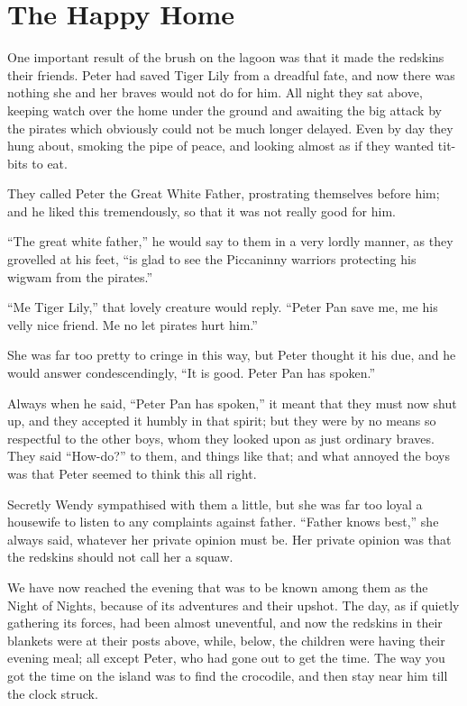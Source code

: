 
\chapter{The Happy Home}

One important result of the brush on the lagoon was that it made the redskins their friends.
Peter had saved Tiger Lily from a dreadful fate,
and now there was nothing she and her braves would not do for him.
All night they sat above,
keeping watch over the home under the ground and awaiting the big attack by the pirates
which obviously could not be much longer delayed.
Even by day they hung about, smoking the pipe of peace, and looking almost as if they wanted tit-bits to eat.

They called Peter the Great White Father, prostrating themselves before him;
and he liked this tremendously, so that it was not really good for him.

“The great white father,” he would say to them in a very lordly manner, as they grovelled at his feet,
“is glad to see the Piccaninny warriors protecting his wigwam from the pirates.”

“Me Tiger Lily,” that lovely creature would reply.
“Peter Pan save me, me his velly nice friend.
Me no let pirates hurt him.”

She was far too pretty to cringe in this way, but Peter thought it his due,
and he would answer condescendingly, “It is good.
Peter Pan has spoken.”

Always when he said, “Peter Pan has spoken,” it meant that they must now shut up,
and they accepted it humbly in that spirit;
but they were by no means so respectful to the other boys,
whom they looked upon as just ordinary braves.
They said “How-do?\@” to them, and things like that;
and what annoyed the boys was that Peter seemed to think this all right.

Secretly Wendy sympathised with them a little,
but she was far too loyal a housewife to listen to any complaints against father.
“Father knows best,” she always said, whatever her private opinion must be.
Her private opinion was that the redskins should not call her a squaw.

We have now reached the evening that was to be known among them as the Night of Nights,
because of its adventures and their upshot.
The day, as if quietly gathering its forces, had been almost uneventful,
and now the redskins in their blankets were at their posts above,
while, below, the children were having their evening meal;
all except Peter, who had gone out to get the time.
The way you got the time on the island was to find the crocodile,
and then stay near him till the clock struck.

